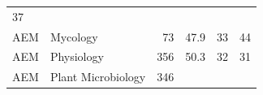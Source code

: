 \documentclass[11pt,]{article}
\begin{document}
\begin{longtable}[]{@{}llrrrr@{}}
\begin{minipage}[t]{0.11\columnwidth}
37\strut
\end{minipage}\tabularnewline
\begin{minipage}[t]{0.06\columnwidth}\raggedright\strut
AEM\strut
\end{minipage} & \begin{minipage}[t]{0.43\columnwidth}\raggedright\strut
Mycology\strut
\end{minipage} & \begin{minipage}[t]{0.04\columnwidth}\raggedleft\strut
73\strut
\end{minipage} & \begin{minipage}[t]{0.08\columnwidth}\raggedleft\strut
47.9\strut
\end{minipage} & \begin{minipage}[t]{0.11\columnwidth}\raggedleft\strut
33\strut
\end{minipage} & \begin{minipage}[t]{0.11\columnwidth}\raggedleft\strut
44\strut
\end{minipage}\tabularnewline
\begin{minipage}[t]{0.06\columnwidth}\raggedright\strut
AEM\strut
\end{minipage} & \begin{minipage}[t]{0.43\columnwidth}\raggedright\strut
Physiology\strut
\end{minipage} & \begin{minipage}[t]{0.04\columnwidth}\raggedleft\strut
356\strut
\end{minipage} & \begin{minipage}[t]{0.08\columnwidth}\raggedleft\strut
50.3\strut
\end{minipage} & \begin{minipage}[t]{0.11\columnwidth}\raggedleft\strut
32\strut
\end{minipage} & \begin{minipage}[t]{0.11\columnwidth}\raggedleft\strut
31\strut
\end{minipage}\tabularnewline
\begin{minipage}[t]{0.06\columnwidth}\raggedright\strut
AEM\strut
\end{minipage} & \begin{minipage}[t]{0.43\columnwidth}\raggedright\strut
Plant Microbiology\strut
\end{minipage} & \begin{minipage}[t]{0.04\columnwidth}\raggedleft\strut
346\strut
\end{minipage} & \begin{minipage}[t]{0.08\columnwidth}\raggedleft\strut

\end{minipage}
\end{longtable}
\end{document}
